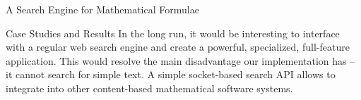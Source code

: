 \begin{omgroup}[id=mathwebsearch,creators={isucan,miko}]{A Search Engine for Mathematical Formulae}
\begin{omgroup}[id=mws.case-study]{Case Studies and Results}
In the long run, it would be interesting to interface {\mmlsearch} with a regular web
search engine and create a powerful, specialized, full-feature application. This would
resolve the main disadvantage our implementation has -- it cannot search for simple
text. A simple socket-based search API allows to integrate {\mmlsearch} into other
content-based mathematical software systems.
\end{omgroup}
\end{omgroup}

